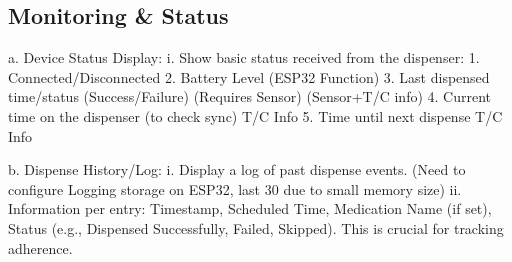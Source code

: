 \subsection{Monitoring \&  Status}

a. Device Status Display:
i. Show basic status received from the dispenser:
1. Connected/Disconnected
2. Battery Level (ESP32 Function)
3. Last dispensed time/status (Success/Failure) (Requires Sensor) (Sensor+T/C info)
4. Current time on the dispenser (to check sync) T/C Info
5. Time until next dispense T/C Info

b. Dispense History/Log:
i. Display a log of past dispense events. (Need to configure Logging storage on ESP32, last 30 due to small memory size)
ii. Information per entry: Timestamp, Scheduled Time, Medication Name (if set), Status (e.g., Dispensed Successfully, Failed, Skipped). This is crucial for tracking adherence.
